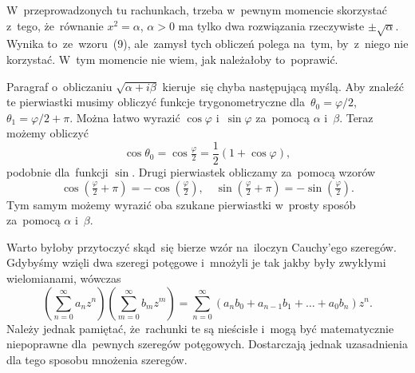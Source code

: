\documentclass[a4paper,11pt]{article}
\begin{document}
\vspace{\spaceFour}





\noindent
{} W~przeprowadzonych tu rachunkach, trzeba w~pewnym momencie
skorzystać z~tego, że~równanie $x^{ 2 } = \alpha$, $\alpha > 0$ ma tylko dwa
rozwiązania rzeczywiste $\pm \sqrt{ \alpha }$. Wynika to~ze~wzoru~(9), ale~zamysł
tych obliczeń polega na~tym, by~z~niego nie korzystać. W~tym momencie nie
wiem, jak należałoby to~poprawić.

\vspace{\spaceFour}





\noindent
{} Paragraf o~obliczaniu $\sqrt{ \alpha + i \beta }$ kieruje~się chyba
następującą myślą. Aby znaleźć te pierwiastki musimy obliczyć funkcje
trygonometryczne dla~$\theta_{ 0 } = \varphi / 2$, $\theta_{ 1 } = \varphi / 2 + \pi$. Można łatwo
wyrazić $\cos \varphi$ i~$\sin \varphi$ za~pomocą $\alpha$ i~$\beta$. Teraz możemy obliczyć
\begin{equation}
  \label{eq:Leja-Funkcje-zespolone-11}
  \cos \theta_{ 0 } = \cos \tfrac{ \varphi }{ 2 } = \frac{ 1 }{ 2 } ( 1 + \cos \varphi ),
\end{equation}
podobnie dla~funkcji $\sin$. Drugi pierwiastek obliczamy za~pomocą
wzorów
\begin{equation}
  \label{eq:Leja-Funkcje-zespolone-12}
  \cos( \tfrac{ \varphi }{ 2 } + \pi ) = -\cos( \tfrac{ \varphi }{ 2 } ), \quad
  \sin( \tfrac{ \varphi }{ 2 } + \pi ) = -\sin( \tfrac{ \varphi }{ 2 } ).
\end{equation}
Tym samym możemy wyrazić oba szukane pierwiastki w~prosty sposób
za~pomocą $\alpha$ i~$\beta$.

\vspace{\spaceFour}





\noindent
{} Warto byłoby przytoczyć skąd~się bierze wzór na~iloczyn
Cauchy’ego szeregów. Gdybyśmy wzięli dwa szeregi potęgowe i~mnożyli je tak
jakby były zwykłymi wielomianami, wówczas
\begin{equation}
  \label{eq:Leja-Funkcje-zespolone-13}
  \left( \sum_{ n = 0 }^{ \infty } a_{ n } z^{ n } \right)
  \left( \sum_{ m = 0 }^{ \infty } b_{ m } z^{ m } \right) = \sum_{ n = 0
  }^{ \infty } ( a_{ n } b_{ 0 } + a_{ n - 1 } b_{ 1 } + \ldots + a_{ 0
  } b_{ n } ) z^{ n }.
\end{equation}
Należy jednak pamiętać, że~rachunki te są nieścisłe i~mogą być
matematycznie niepoprawne dla~pewnych szeregów potęgowych. Dostarczają
jednak uzasadnienia dla tego sposobu mnożenia szeregów.
\end{document}
